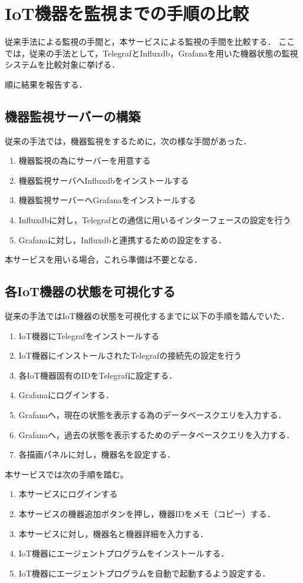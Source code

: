 \section{IoT機器を監視までの手順の比較}
従来手法による監視の手間と，本サービスによる監視の手間を比較する．
ここでは，従来の手法として，TelegrafとInfluxdb，Grafanaを用いた機器状態の監視システムを比較対象に挙げる．

順に結果を報告する．
\subsection{機器監視サーバーの構築}
従来の手法では，機器監視をするために，次の様な手間があった．
\begin{enumerate}
\item 機器監視の為にサーバーを用意する
\item 機器監視サーバへInfluxdbをインストールする
\item 機器監視サーバーへGrafanaをインストールする
\item Influxdbに対し，Telegrafとの通信に用いるインターフェースの設定を行う
\item Grafanaに対し，Influxdbと連携するための設定をする．
\end{enumerate}

本サービスを用いる場合，これら準備は不要となる．

\subsection{各IoT機器の状態を可視化する}
従来の手法ではIoT機器の状態を可視化するまでに以下の手順を踏んでいた．
\begin{enumerate}
\item IoT機器にTelegrafをインストールする
\item IoT機器にインストールされたTelegrafの接続先の設定を行う
\item 各IoT機器固有のIDをTelegrafに設定する．
\item Grafanaにログインする．
\item Grafanaへ，現在の状態を表示する為のデータベースクエリを入力する．
\item Grafanaへ，過去の状態を表示するためのデータベースクエリを入力する．
\item 各描画パネルに対し，機器名を設定する．
\end{enumerate}

本サービスでは次の手順を踏む。
\begin{enumerate}
\item 本サービスにログインする
\item 本サービスの機器追加ボタンを押し，機器IDをメモ（コピー）する．
\item 本サービスに対し，機器名と機器詳細を入力する．
\item IoT機器にエージェントプログラムをインストールする．
\item IoT機器にエージェントプログラムを自動で起動するよう設定する．
\end{enumerate}

